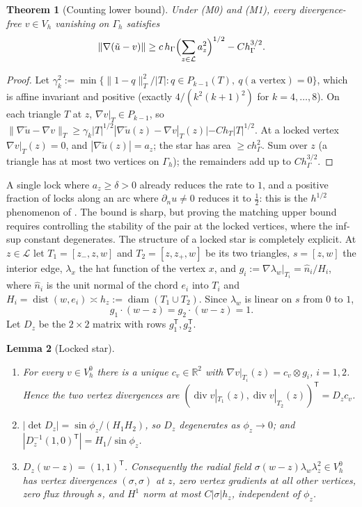 \documentclass[pdflatex,sn-mathphys-num]{sn-jnl}
\theoremstyle{thmstyleone}
\newtheorem{theorem}{Theorem}[section]
\newtheorem{lemma}[theorem]{Lemma}
\theoremstyle{thmstylethree}
\newcommand{\R}{\mathbb R}
\newcommand{\hG}{h_\Gamma}
\newcommand{\Gh}{\Gamma_h}
\newcommand{\Vh}{V_h}
\newcommand{\VO}{V_h^0}
\newcommand{\dn}{\partial_n}
\newcommand{\ut}{\tilde u}
\newcommand{\norm}[1]{\lVert #1\rVert}
\renewcommand{\div}{\operatorname{div}}
\newcommand{\Lk}{\mathcal L}
\DeclareMathOperator{\diam}{diam}
\DeclareMathOperator{\dist}{dist}
\begin{document}
\begin{theorem}[Counting lower bound]\label{thm:st:count}
Under (M0) and (M1), every divergence-free $v\in\Vh$ vanishing on $\Gh$ satisfies
\[
\norm{\nabla(\ut-v)}\ge c\,\hG\Bigl(\sum_{z\in\Lk}a_z^2\Bigr)^{1/2}-C\hG^{3/2}.
\]
\end{theorem}

\begin{proof}
Let $\gamma_k^2:=\min\{\norm{1-q}^2_T/|T|:q\in P_{k-1}(T),\ q(\text{a vertex})=0\}$, which is affine invariant and positive (exactly $4/(k^2(k+1)^2)$ for $k=4,\dots,8$). On each triangle $T$ at $z$, $\nabla v|_T\in P_{k-1}$, so $\norm{\nabla\ut-\nabla v}_T\ge\gamma_k|T|^{1/2}|\nabla\ut(z)-\nabla v|_T(z)|-Ch_T|T|^{1/2}$. At a locked vertex $\nabla v|_T(z)=0$, and $|\nabla\ut(z)|=a_z$; the star has area $\ge c\hG^2$. Sum over $z$ (a triangle has at most two vertices on $\Gh$); the remainders add up to $C\hG^{3/2}$.
\end{proof}

A single lock where $a_z\ge\delta>0$ already reduces the rate to $1$, and a positive fraction of locks along an arc where $\dn u\ne0$ reduces it to $\frac12$: this is the $h^{1/2}$ phenomenon of \cite{ScottPrize,GjerdeScott2024}. The bound is sharp, but proving the matching upper bound requires controlling the stability of the pair at the locked vertices, where the inf-sup constant degenerates. The structure of a locked star is completely explicit. At $z\in\Lk$ let $T_1=[z_-,z,w]$ and $T_2=[z,z_+,w]$ be its two triangles, $s=[z,w]$ the interior edge, $\lambda_x$ the hat function of the vertex $x$, and $g_i:=\nabla\lambda_w|_{T_i}=\hat n_i/H_i$, where $\hat n_i$ is the unit normal of the chord $e_i$ into $T_i$ and $H_i=\dist(w,e_i)\asymp h_z:=\diam(T_1\cup T_2)$. Since $\lambda_w$ is linear on $s$ from $0$ to $1$,
\begin{equation}\label{eq:st:gs}
g_1\cdot(w-z)=g_2\cdot(w-z)=1 .
\end{equation}
Let $D_z$ be the $2\times2$ matrix with rows $g_1^{\mathsf T},g_2^{\mathsf T}$.

\begin{lemma}[Locked star]\label{lem:st:K}
\begin{enumerate}[label=(\alph*)]
\item For every $v\in\VO$ there is a unique $c_v\in\R^2$ with $\nabla v|_{T_i}(z)=c_v\otimes g_i$, $i=1,2$. Hence the two vertex divergences are $(\div v|_{T_1}(z),\div v|_{T_2}(z))^{\mathsf T}=D_zc_v$.
\item $|\det D_z|=\sin\phi_z/(H_1H_2)$, so $D_z$ degenerates as $\phi_z\to0$; and $|D_z^{-1}(1,0)^{\mathsf T}|=H_1/\sin\phi_z$.
\item $D_z(w-z)=(1,1)^{\mathsf T}$. Consequently the radial field $\sigma(w-z)\lambda_w\lambda_z^2\in\VO$ has vertex divergences $(\sigma,\sigma)$ at $z$, zero vertex gradients at all other vertices, zero flux through $s$, and $H^1$ norm at most $C|\sigma|h_z$, independent of $\phi_z$.
\end{enumerate}
\end{lemma}
\end{document}
